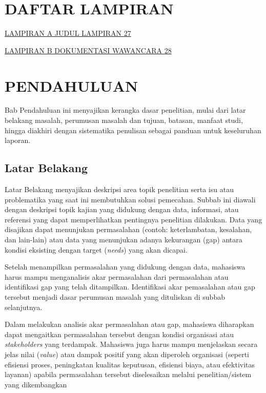 \hypertarget{daftar-lampiran}{%
\section{DAFTAR LAMPIRAN}\label{daftar-lampiran}}

\protect\hyperlink{_Toc211427018}{LAMPIRAN A JUDUL LAMPIRAN
\protect\hyperlink{_Toc211427018}{27}}

\protect\hyperlink{_Toc211427019}{LAMPIRAN B DOKUMENTASI WAWANCARA
\protect\hyperlink{_Toc211427019}{28}}

\hypertarget{pendahuluan}{%
\section{PENDAHULUAN}\label{pendahuluan}}

Bab Pendahuluan ini menyajikan kerangka dasar penelitian, mulai dari
latar belakang masalah, perumusan masalah dan tujuan, batasan, manfaat
studi, hingga diakhiri dengan sistematika penulisan sebagai panduan
untuk keseluruhan laporan.

\hypertarget{latar-belakang}{%
\subsection{\texorpdfstring{Latar Belakang
}{Latar Belakang }}\label{latar-belakang}}

Latar Belakang menyajikan deskripsi area topik penelitian serta isu atau
problematika yang saat ini membutuhkan solusi pemecahan. Subbab ini
diawali dengan deskripsi topik kajian yang didukung dengan data,
informasi, atau referensi yang dapat memperlihatkan pentingnya
penelitian dilakukan. Data yang disajikan dapat menunjukan permasalahan
(contoh: keterlambatan, kesalahan, dan lain-lain) atau data yang
menunjukan adanya kekurangan (gap) antara kondisi eksisting dengan
target (\emph{needs}) yang akan dicapai.

Setelah menampilkan permasalahan yang didukung dengan data, mahasiswa
harus mampu menganalisis akar permasalahan dari permasalahan atau
identifikasi gap yang telah ditampilkan. Identifikasi akar pemasalahan
atau gap tersebut menjadi dasar perumusan masalah yang dituliskan di
subbab selanjutnya.

Dalam melakukan analisis akar permasalahan atau gap, mahasiswa
diharapkan dapat mengaitkan permasalahan tersebut dengan kondisi
organisasi atau \emph{stakeholders} yang terdampak. Mahasiswa juga harus
mampu menjelaskan secara jelas nilai (\emph{value}) atau dampak positif
yang akan diperoleh organisasi (seperti efisiensi proses, peningkatan
kualitas keputusan, efisiensi biaya, atau efektivitas layanan) apabila
permasalahan tersebut diselesaikan melalui penelitian/sistem yang
dikembangkan

